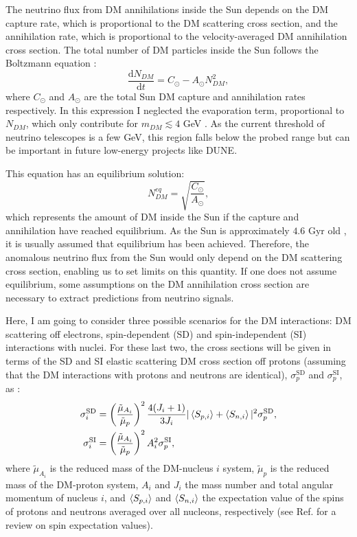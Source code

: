 The neutrino flux from DM annihilations inside the Sun depends on the DM capture rate, which is proportional to the DM scattering cross section, and the annihilation rate, which is proportional to the velocity-averaged DM annihilation cross section. The total number of DM particles inside the Sun follows the Boltzmann equation \cite{Bernal2012}:
\begin{equation}\label{2.1}
	\frac{\mathrm{d} N_{DM}}{\mathrm{d} t} = C_{\odot} - A_{\odot} N_{DM}^{2},
\end{equation}
where $C_{\odot}$ and $A_{\odot}$ are the total Sun DM capture and annihilation rates respectively. In this expression I neglected the evaporation term, proportional to $N_{DM}$, which only contribute for $m_{DM}\lesssim 4$ GeV \cite{Busoni2013}. As the current threshold of neutrino telescopes is a few GeV, this region falls below the probed range but can be important in future low-energy projects like DUNE.

This equation has an equilibrium solution:
\begin{equation}\label{2.2}
	N_{DM}^{eq} = \sqrt{\frac{C_{\odot}}{A_{\odot}}},
\end{equation}
which represents the amount of DM inside the Sun if the capture and annihilation have reached equilibrium. As the Sun is approximately $4.6$ Gyr old \cite{Bahcall1995}, it is usually assumed that equilibrium has been achieved. Therefore, the anomalous neutrino flux from the Sun would only depend on the DM scattering cross section, enabling us to set limits on this quantity. If one does not assume equilibrium, some assumptions on the DM annihilation cross section are necessary to extract predictions from neutrino signals.

Here, I am going to consider three possible scenarios for the DM interactions: DM scattering off electrons, spin-dependent (SD) and spin-independent (SI) interactions with nuclei. For these last two, the cross sections will be given in terms of the SD and SI elastic scattering DM cross section off protons (assuming that the DM interactions with protons and neutrons are identical), $\sigma_{p}^{\mathrm{SD}}$ and $\sigma_{p}^{\mathrm{SI}}$, as \cite{Bernal2012,Palomares2017}:
\begin{align}\label{2.3-2.4}
	\sigma_{i}^{\mathrm{SD}} &= \left(\frac{\tilde{\mu}_{A_{i}}}{\tilde{\mu}_{p}}\right)^{2} \frac{4(J_{i}+1)}{3 J_{i}} |\expval{S_{p,i}} + \expval{S_{n,i}}|^{2} \sigma_{p}^{\mathrm{SD}},\\
	\sigma_{i}^{\mathrm{SI}} &= \left(\frac{\tilde{\mu}_{A_{i}}}{\tilde{\mu}_{p}}\right)^{2} A_{i}^{2} \sigma_{p}^{\mathrm{SI}},
\end{align}
where $\tilde{\mu}_{A_{i}}$ is the reduced mass of the DM-nucleus $i$ system, $\tilde{\mu}_{p}$ is the reduced mass of the DM-proton system, $A_{i}$ and $J_{i}$ the mass number and total angular momentum of nucleus $i$, and $\expval{S_{p,i}}$ and $\expval{S_{n,i}}$ the expectation value of the spins of protons and neutrons averaged over all nucleons, respectively (see Ref. \cite{Bednyakov2004} for a review on spin expectation values).

